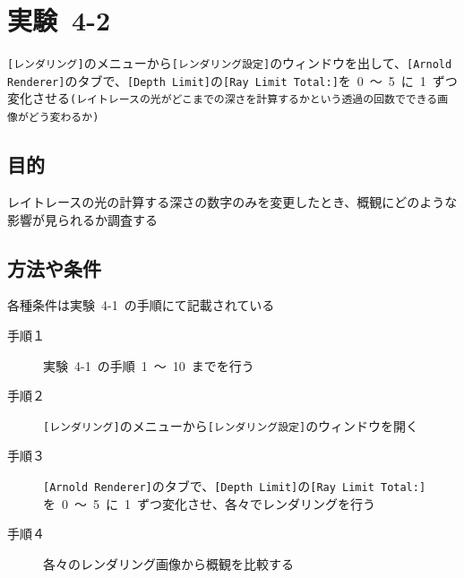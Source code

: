 \documentclass[a4j]{jarticle}
\begin{document}
\newpage
\section{実験\ 4-2}
\verb|[レンダリング]|のメニューから\verb|[レンダリング設定]|のウィンドウを出して、\verb|[Arnold Renderer]|のタブで、\verb|[Depth Limit]|の\verb|[Ray Limit Total:]|を\ 0\ ～\ 5\ に\ 1\ ずつ変化させる\verb|(レイトレースの光がどこまでの深さを計算するかという透過の回数でできる画像がどう変わるか)|
\subsection{目的}
%
レイトレースの光の計算する深さの数字のみを変更したとき、概観にどのような影響が見られるか調査する
%
\subsection{方法や条件}
%
各種条件は実験\ 4-1\ の手順にて記載されている
\begin{description}
  \item[手順１] 実験\ 4-1\ の手順\ 1\ ～\ 10\ までを行う
  \item[手順２] \verb|[レンダリング]|のメニューから\verb|[レンダリング設定]|のウィンドウを開く
  \item[手順３] \verb|[Arnold Renderer]|のタブで、\verb|[Depth Limit]|の\verb|[Ray Limit Total:]|を\ 0\ ～\ 5\ に\ 1\ ずつ変化させ、各々でレンダリングを行う
  \item[手順４] 各々のレンダリング画像から概観を比較する 
\end{description}
%
\end{document}
